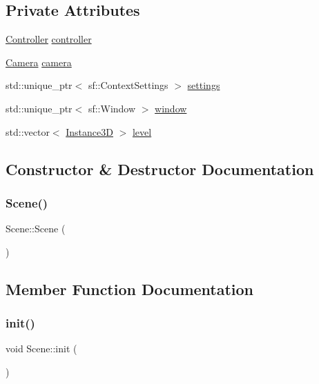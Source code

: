 \subsection*{Private Attributes}
\begin{DoxyCompactItemize}
\item 
\hyperlink{classController}{Controller} \hyperlink{classScene_aac14170851aa8186820beae6a2097bc9}{controller}
\item 
\hyperlink{classCamera}{Camera} \hyperlink{classScene_afed13ec4ba2d7ab75b273d507911b498}{camera}
\item 
std\+::unique\+\_\+ptr$<$ sf\+::\+Context\+Settings $>$ \hyperlink{classScene_a23cafa9acb6cc5caa3d3cfa001aea369}{settings}
\item 
std\+::unique\+\_\+ptr$<$ sf\+::\+Window $>$ \hyperlink{classScene_ab8f34017bc48b3c98e16be0ce44adf46}{window}
\item 
std\+::vector$<$ \hyperlink{classInstance3D}{Instance3D} $>$ \hyperlink{classScene_a04300c11c1aaaaae2019e0f9208c9252}{level}
\end{DoxyCompactItemize}


\subsection{Constructor \& Destructor Documentation}
\mbox{\label{classScene_ad10176d75a9cc0da56626f682d083507}} 
\subsubsection{\texorpdfstring{Scene()}{Scene()}}
{\footnotesize\ttfamily Scene\+::\+Scene (\begin{DoxyParamCaption}{ }\end{DoxyParamCaption})}



\subsection{Member Function Documentation}
\mbox{\label{classScene_abb3b6efc6fdba03cd96436edaf08a967}} 
\subsubsection{\texorpdfstring{init()}{init()}}
{\footnotesize\ttfamily void Scene\+::init (\begin{DoxyParamCaption}{ }\end{DoxyParamCaption})}

